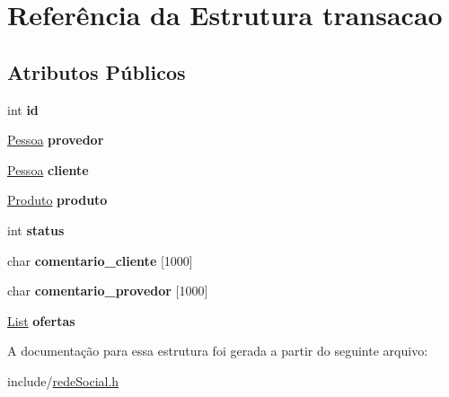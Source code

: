 \hypertarget{structtransacao}{}\section{Referência da Estrutura transacao}
\label{structtransacao}
\subsection*{Atributos Públicos}
\begin{DoxyCompactItemize}
\item 
\mbox{\label{structtransacao_aa4136876fb27948aedaf0dfb35e6b4ec}} 
int {\bfseries id}
\item 
\mbox{\label{structtransacao_ae8932bd1de3dd41906f357310aa1a3b4}} 
\hyperlink{structpessoa}{Pessoa} {\bfseries provedor}
\item 
\mbox{\label{structtransacao_a35f236c864743a8224cdcc4ef08875bf}} 
\hyperlink{structpessoa}{Pessoa} {\bfseries cliente}
\item 
\mbox{\label{structtransacao_a711d494042bf522088f3f25fc7299a21}} 
\hyperlink{structproduto}{Produto} {\bfseries produto}
\item 
\mbox{\label{structtransacao_ad1859124a1c74c98a285e73e2ef53ba5}} 
int {\bfseries status}
\item 
\mbox{\label{structtransacao_a1d863f578f35716ea5e7fade6814fc42}} 
char {\bfseries comentario\+\_\+cliente} \mbox{[}1000\mbox{]}
\item 
\mbox{\label{structtransacao_a7a0227cacf8430fe32e55048e35ca302}} 
char {\bfseries comentario\+\_\+provedor} \mbox{[}1000\mbox{]}
\item 
\mbox{\label{structtransacao_acbb11d435f016382611f086217b740ad}} 
\hyperlink{lista_8h_a698ff83165b8296011a50bb9aba83964}{List} {\bfseries ofertas}
\end{DoxyCompactItemize}


A documentação para essa estrutura foi gerada a partir do seguinte arquivo\+:\begin{DoxyCompactItemize}
\item 
include/\hyperlink{redeSocial_8h}{rede\+Social.\+h}\end{DoxyCompactItemize}
